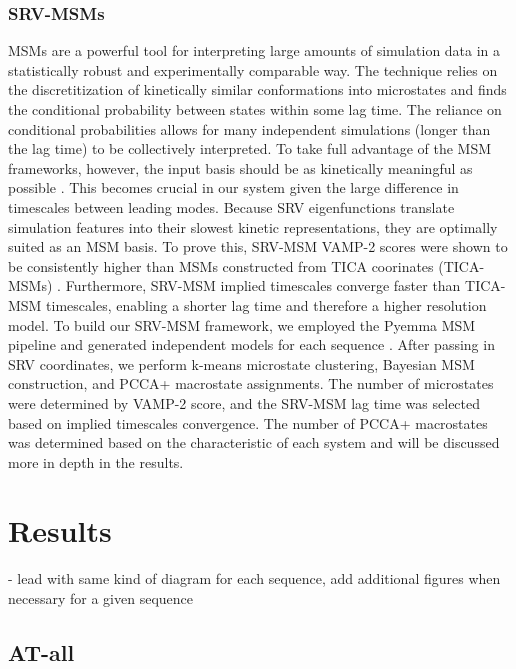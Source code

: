 \documentclass[journal=jpcbfk,manuscript=article]{achemso}
\begin{document}
\subsubsection{\label{sec:methods}SRV-MSMs}

MSMs are a powerful tool for interpreting large amounts of simulation data in a statistically robust and experimentally comparable way. The technique relies on the discretitization of kinetically similar conformations into microstates and finds the conditional probability between states within some lag time. The reliance on conditional probabilities allows for many independent simulations (longer than the lag time) to be collectively interpreted. To take full advantage of the MSM frameworks, however, the input basis should be as kinetically meaningful as possible \citep{Pande2010EverythingAsk}. This becomes crucial in our system given the large difference in timescales between leading modes. Because SRV eigenfunctions translate simulation features into their slowest kinetic representations, they are optimally suited as an MSM basis. To prove this, SRV-MSM VAMP-2 scores were shown to be consistently higher than MSMs constructed from TICA coorinates (TICA-MSMs) \citep{Sidky}. Furthermore, SRV-MSM implied timescales converge faster than TICA-MSM timescales, enabling a shorter lag time and therefore a higher resolution model. To build our SRV-MSM framework, we employed the Pyemma MSM pipeline and generated independent models for each sequence \citep{Scherer2015PyEMMAModels}. After passing in SRV coordinates, we perform k-means microstate clustering, Bayesian MSM construction, and PCCA+ macrostate assignments. The number of microstates were determined by VAMP-2 score, and the SRV-MSM lag time was selected based on implied timescales convergence.  The number of PCCA+ macrostates was determined based on the characteristic of each system and will be discussed more in depth in the results. 


\section{\label{sec:Results}Results}
- lead with same kind of diagram for each sequence, add additional figures when necessary for a given sequence

\subsection{\label{sec:Results}AT-all}
\end{document}

